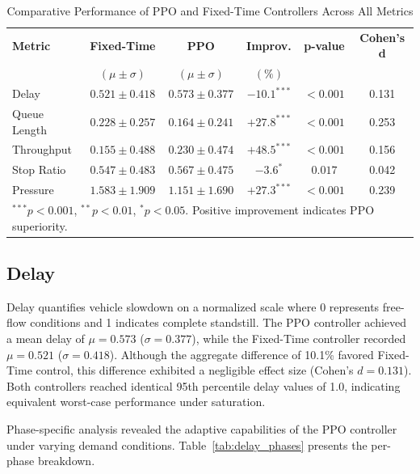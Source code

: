 \documentclass[11pt, a4paper]{report}
\begin{document}
\begin{table}[htbp]
\centering
\caption{Comparative Performance of PPO and Fixed-Time Controllers Across All Metrics}
\label{tab:overall_results}
\begin{tabular}{lccccc}
\toprule
\textbf{Metric} & \textbf{Fixed-Time} & \textbf{PPO} & \textbf{Improv.} & \textbf{p-value} & \textbf{Cohen's d} \\
 & $(\mu \pm \sigma)$ & $(\mu \pm \sigma)$ & $(\%)$ & & \\
\midrule
Delay & $0.521 \pm 0.418$ & $0.573 \pm 0.377$ & $-10.1^{***}$ & $<0.001$ & 0.131 \\
Queue Length & $0.228 \pm 0.257$ & $0.164 \pm 0.241$ & $+27.8^{***}$ & $<0.001$ & 0.253 \\
Throughput & $0.155 \pm 0.488$ & $0.230 \pm 0.474$ & $+48.5^{***}$ & $<0.001$ & 0.156 \\
Stop Ratio & $0.547 \pm 0.483$ & $0.567 \pm 0.475$ & $-3.6^{*}$ & $0.017$ & 0.042 \\
Pressure & $1.583 \pm 1.909$ & $1.151 \pm 1.690$ & $+27.3^{***}$ & $<0.001$ & 0.239 \\
\bottomrule
\multicolumn{6}{l}{\footnotesize $^{***}p<0.001$, $^{**}p<0.01$, $^{*}p<0.05$. Positive improvement indicates PPO superiority.}
\end{tabular}
\end{table}

\subsection{Delay}

Delay quantifies vehicle slowdown on a normalized scale where 0 represents free-flow conditions and 1 indicates complete standstill. The PPO controller achieved a mean delay of $\mu = 0.573$ ($\sigma = 0.377$), while the Fixed-Time controller recorded $\mu = 0.521$ ($\sigma = 0.418$). Although the aggregate difference of 10.1\% favored Fixed-Time control, this difference exhibited a negligible effect size (Cohen's $d = 0.131$). Both controllers reached identical 95th percentile delay values of 1.0, indicating equivalent worst-case performance under saturation.

Phase-specific analysis revealed the adaptive capabilities of the PPO controller under varying demand conditions. Table~\ref{tab:delay_phases} presents the per-phase breakdown.
\end{document}
